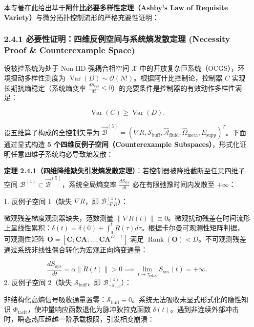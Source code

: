 \documentclass[11pt,a4paper,oneside]{ctexart}
\begin{document}
本专著在此给出基于\textbf{阿什比必要多样性定理（Ashby's Law of Requisite Variety）}与微分拓扑控制流形的严格充要性证明：


\subsubsection{2.4.1 必要性证明：四维反例空间与系统熵发散定理 (Necessity Proof \& Counterexample Space)}

设被控系统为处于 Non-IID 强耦合相空间 $\mathcal{X}$ 中的开放复杂巨系统（OCGS），环境摄动多样性测度为 $\operatorname{Var}(D) \sim \mathcal{O}(N!)$。根据阿什比控制论，控制器 $C$ 实现长期抗熵稳定（系统熵变率 $\frac{d S_{\text{sys}}}{dt} \le 0$）的充要条件是控制器的有效动作多样性满足：

\begin{equation}
\operatorname{Var}(C) \ge \operatorname{Var}(D).
\end{equation}

设五维算子构成的全控制矢量为 $\vec{\mathcal{B}}^{(5)} = (\nabla R, \mathcal{S}_{\text{buff}}, \hat{\mathcal{A}}_{\text{fluid}}, \hat{\Omega}_{\text{meta}}, E_{\text{supp}})^T$。下面通过显式构造 \textbf{5 个四维反例子空间（Counterexample Subspaces）}，形式化证明任意四维子系统均必导致熵发散：


\textbf{定理 2.4.1（四维降维缺失引发熵发散定理）}：若控制器被降维截断至任意四维子空间 $\mathcal{B}^{(4)} \subset \vec{\mathcal{B}}^{(5)}$，系统全局熵变率 $\frac{d S_{\text{sys}}}{dt}$ 必在有限弛豫时间内发散至 $+\infty$：


1. \textit{}反例子空间 1（缺失 $\nabla R$，即 $\mathcal{B}_{\neg \nabla R}^{(4)}$）\textit{}：

微观残差梯度观测器缺失，范数测量 $\|\nabla R(t)\| \equiv 0$。微观扰动残差在时间流形上呈线性累积：$\delta(t) = \delta(0) + \int_0^t \dot{R}(\tau) d\tau$。根据卡尔曼可观测性矩阵判据，可观测性矩阵 $\mathbf{O} = [\mathbf{C}; \mathbf{CA}; \dots; \mathbf{CA}^{D-1}]$ 满足 $\operatorname{Rank}(\mathbf{O}) < D$。不可观测残差通过系统非线性偶合转化为宏观正向熵变通量：

\begin{equation}
\frac{d S_{\text{sys}}}{dt} = \alpha \|\dot{R}(t)\| > 0 \implies \lim_{t \to \tau_{\text{relax}}} S_{\text{sys}}(t) = +\infty.
\end{equation}
2. \textit{}反例子空间 2（缺失 $\mathcal{S}_{\text{buff}}$，即 $\mathcal{B}_{\neg \mathcal{S}_{\text{buff}}}^{(4)}$）\textit{}：

非结构化高熵信号吸收通量置零：$\mathcal{S}_{\text{buff}} \equiv 0$。系统无法吸收未显式形式化的隐性知识 $\Phi_{\text{tacit}}$，使冲量响应函数退化为脉冲狄拉克函数 $\delta(t)$。遇到非连续外部冲击时，瞬态热压超越一阶承载极限，引发相变崩溃：
\end{document}
